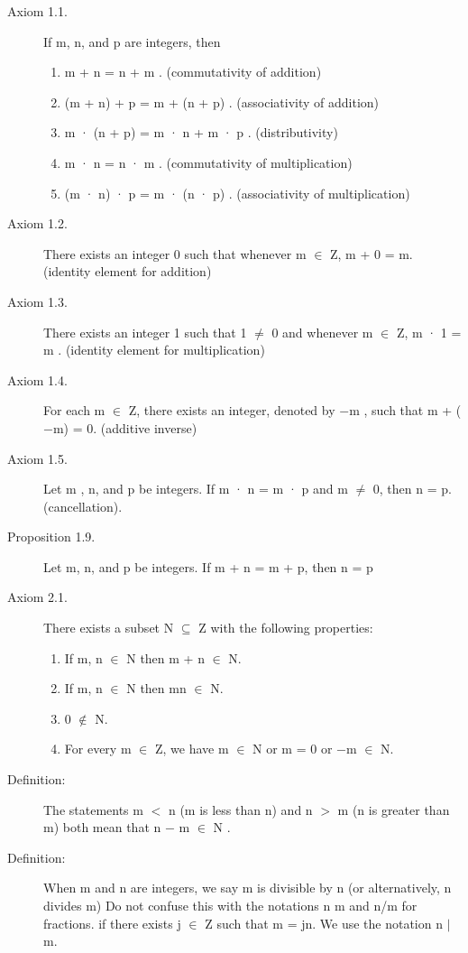 \documentclass[12pt]{article}
\begin{document}
\begin{enumerate}
\begin{description}
\item[Axiom 1.1.] If m, n, and p are integers, then
\begin{enumerate}
\item m + n = n + m . (commutativity of addition)
\item  (m + n) + p = m + (n + p) . (associativity of addition)
\item  m · (n + p) = m · n + m · p . (distributivity)
\item m · n = n · m . (commutativity of multiplication)
\item  (m · n) · p = m · (n · p) . (associativity of multiplication)
\end{enumerate}
\item[Axiom 1.2.] There exists an integer 0 such that whenever m $\in$ Z, m + 0 = m.
(identity element for addition)
\item[Axiom 1.3.] There exists an integer 1 such that 1 $\neq$  0 and whenever m $\in$ Z, m · 1 = m .
(identity element for multiplication)
\item[Axiom 1.4.] For each m $\in$ Z, there exists an integer, denoted by $-$m , such that m +
($-$m) = 0. (additive inverse)
\item[Axiom 1.5.] Let m , n, and p be integers. If m · n = m · p and m $\neq$ 0, then n = p. (cancellation).
\item[Proposition 1.9.] Let m, n, and p be integers. If m + n = m + p, then n = p
\item[Axiom 2.1.] There exists a subset N $\subseteq$ Z with the following properties:
\begin{enumerate}
\item If m, n $\in$ N then m + n $\in$ N.
\item  If m, n $\in$  N then mn $\in$ N.
\item  0 $\not\in$ N.
\item  For every m $\in$ Z, we have m $\in$ N or m = 0 or $-$m $\in$ N.
\end{enumerate}
\item[Definition:]The statements m $<$ n (m is less than n) and n $>$ m (n is greater than
m) both mean that
n $-$ m $\in$ N .
\item[Definition:]  When m and n are integers, we say m is divisible by n (or alternatively, n divides m) Do not confuse this with the
notations n
m and n/m for
fractions.
if there exists j $\in$ Z such that m = jn. We use the notation n $|$ m.

\end{description}

\end{enumerate}
\end{document}
